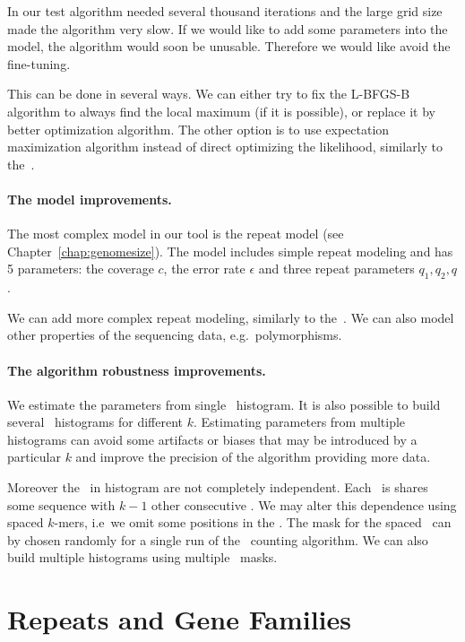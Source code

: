 In our test algorithm needed several thousand iterations and the large grid size made the algorithm very slow. If we would like to add some parameters into the model, the algorithm would soon be unusable. Therefore we would like avoid the fine-tuning.

This can be done in several ways. We can either try to fix the L-BFGS-B algorithm to always find the local maximum (if it is possible), or replace it by better optimization algorithm. The other option is to use expectation maximization algorithm instead of direct optimizing the likelihood, similarly to the~\cite{waterman}.

\paragraph{The model improvements.}
The most complex model in our tool is the repeat model (see Chapter~\ref{chap:genomesize}). The model includes simple repeat modeling and has 5 parameters: the coverage $c$, the error rate $\epsilon$ and three repeat parameters $q_1, q_2, q$.

We can add more complex repeat modeling, similarly to the~\cite{williams}. We can also model other properties of the sequencing data, e.g.\ polymorphisms.

\paragraph{The algorithm robustness improvements.}

We estimate the parameters from single \kmer\ histogram. It is also possible to build several \kmer\ histograms for different $k$. Estimating parameters from multiple histograms can avoid some artifacts or biases that may be introduced by a particular $k$ and improve the precision of the algorithm providing more data.

Moreover the \kmers\ in histogram are not completely independent. Each \kmer\ is shares some sequence with $k-1$ other consecutive \kmers. We may alter this dependence using spaced $k$-mers, i.e\ we omit some positions in the \kmer.
The mask for the spaced \kmers\ can by chosen randomly for a single run of the \kmer\ counting algorithm. We can also build multiple histograms using multiple \kmer\ masks.

\section{Repeats and Gene Families}\label{sect:repeats-families}

